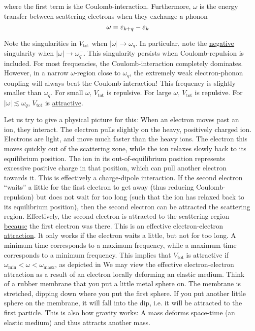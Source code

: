 where the first term is the Coulomb-interaction. 
Furthermore, $\omega$ is the energy transfer between scattering electrons when they exchange a phonon
\begin{equation}
\omega = \varepsilon_{k+q} - \varepsilon_k
\end{equation}


Note the singularities in $V_{\text{tot}}$ when $|\omega|\rightarrow\omega_q$. In particular, note the \underline{negative} singularity when $|\omega|\rightarrow\omega_q^-$. This singularity persists when Coulomb-repulsion is included. For most frequencies, the Coulomb-interaction completely dominates. However, in a narrow $\omega$-region close to $\omega_q$, the extremely weak electron-phonon coupling will always beat the Coulomb-interaction! This frequency is slightly smaller than $\omega_q$. For small $\omega$, $V_{\text{tot}}$ is repulsive. For large $\omega$, $V_{\text{tot}}$ is repulsive. For $|\omega| \lesssim \omega_q$, $V_{\text{tot}}$ is \underline{attractive}.

Let us try to give a physical picture for this: When an electron moves past an ion, they interact. The electron pulls slightly on the heavy, positively charged ion. Electrons are light, and move much faster than the heavy ions. The electron this moves quickly out of the scattering zone, while the ion relaxes slowly back to its equilibrium position. The ion in its out-of-equilibrium position represents excessive positive charge in that position, which can pull another electron towards it. This is effectively a charge-dipole interaction. If the second electron ``waits'' a little for the first electron to get away (thus reducing Coulomb-repulsion) but does not wait for too long (such that the ion has relaxed back to its equilibrium position), then the second electron can be attracted the scattering region. Effectively, the second electron is attracted to the scattering region \underline{because} the first electron was there. This is an effective electron-electron \underline{attraction}. It only works if the electron waits a little, but not for too long. 
A minimum time corresponds to a maximum frequency, while a maximum time corresponds to a minimum frequency. This implies that $V_{\text{tot}}$ is attractive if $\omega_\text{min} <\omega<\omega_\text{masx}$, as depicted in 
We may view the effective electron-electron attraction as a result of an electron locally deforming an elastic medium. Think of a rubber membrane that you put a little metal sphere on. The membrane is stretched, dipping down where you put the first sphere. If you put another little sphere on the membrane, it will fall into the dip, i.e. it will be attracted to the first particle.
This is also how gravity works: A mass deforms space-time (an elastic medium) and thus attracts another mass. 

